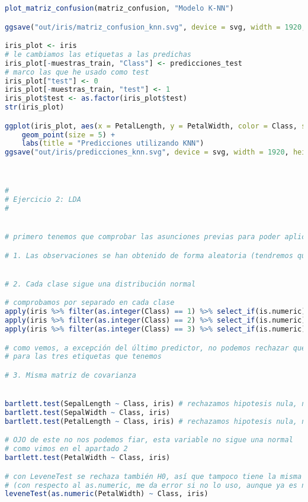\begin{lstlisting}[language=R]
plot_matriz_confusion(matriz_confusion, "Modelo K-NN")

ggsave("out/iris/matriz_confusion_knn.svg", device = svg, width = 1920, height = 1080, units = "px", dpi = 150)

iris_plot <- iris
# le cambiamos las etiquetas a las predichas
iris_plot[-muestras_train, "Class"] <- predicciones_test
# marco las que he usado como test
iris_plot["test"] <- 0
iris_plot[-muestras_train, "test"] <- 1
iris_plot$test <- as.factor(iris_plot$test)
str(iris_plot)

ggplot(iris_plot, aes(x = PetalLength, y = PetalWidth, color = Class, shape = test)) +
	geom_point(size = 5) +
	labs(title = "Predicciones utilizando KNN")
ggsave("out/iris/predicciones_knn.svg", device = svg, width = 1920, height = 1080, units = "px", dpi = 150)



#
# Ejercicio 2: LDA
#


# primero tenemos que comprobar las asunciones previas para poder aplicar LDA

# 1. Las observaciones se han obtenido de forma aleatoria (tendremos que suponer que así ha sido)


# 2. Cada clase sigue una distribución normal

# comprobamos por separado en cada clase
apply(iris %>% filter(as.integer(Class) == 1) %>% select_if(is.numeric), 2, shapiro.test)
apply(iris %>% filter(as.integer(Class) == 2) %>% select_if(is.numeric), 2, shapiro.test)
apply(iris %>% filter(as.integer(Class) == 3) %>% select_if(is.numeric), 2, shapiro.test)

# como vemos, a excepción del último predictor, no podemos rechazar que siga una distribución normal
# para las tres etiquetas que tenemos

# 3. Misma matriz de covarianza


bartlett.test(SepalLength ~ Class, iris) # rechazamos hipotesis nula, no sigue la misma covarianza
bartlett.test(SepalWidth ~ Class, iris)
bartlett.test(PetalLength ~ Class, iris) # rechazamos hipotesis nula, no sigue la misma covarianza

# OJO de este no nos podemos fiar, esta variable no sigue una normal
# como vimos en el apartado 2
bartlett.test(PetalWidth ~ Class, iris)

# con LeveneTest se rechaza también H0, así que tampoco tiene la misma covarianza
# (con respecto al as.numeric, me da error si no lo uso, aunque ya es numerico, no se por que)
leveneTest(as.numeric(PetalWidth) ~ Class, iris)


\end{lstlisting}
